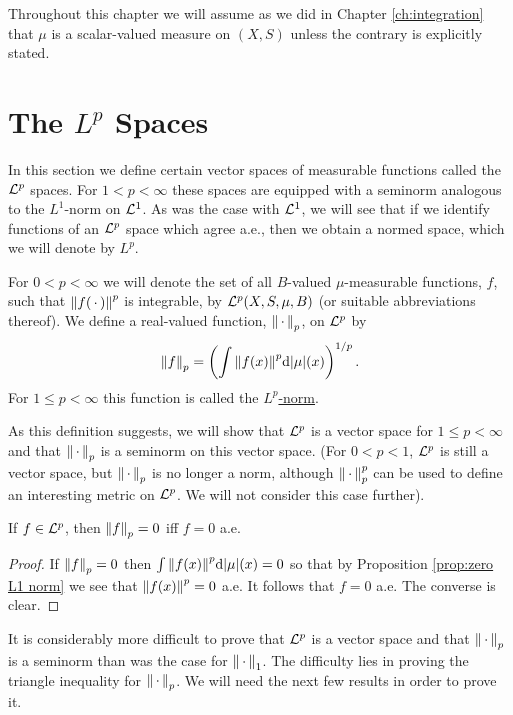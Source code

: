 
Throughout this chapter we will assume as we did in Chapter \ref{ch:integration} that $\mu$ is a scalar-valued measure on $(X,S)$ unless the contrary is explicitly stated.

\section{The \texorpdfstring{$L^p$}{Lp} Spaces}

In this section we define certain vector spaces of measurable functions called the ${\cal L}^p$ spaces. For $1<p<\infty$ these spaces are equipped with a seminorm analogous to the $L^1$-norm on ${\cal L}^1$. As was the case with ${\cal L}^1$, we will see that if we identify functions of an ${\cal L}^p$ space which agree a.e., then we obtain a normed space, which we will denote by $L^p$.

\begin{definition}
For $0<p<\infty$ we will denote the set of all $B$-valued $\mu$-measurable functions, $f$, such that $\norm{f(\,\cdot\,)}^p$ is integrable, by ${\cal L}^p(X,S,\mu,B)$ (or suitable abbreviations thereof). We define a real-valued function, $\norm{\,\cdot\,}_p$, on ${\cal L}^p$ by $$\norm{f}_p=\left(\int\norm{f(x)}^p\dd|\mu|(x)\right)^{1/p}.$$ For $1\leq p<\infty$ this function is called the \underline{$L^p$-norm}.
\end{definition}

As this definition suggests, we will show that ${\cal L}^p$ is a vector space for $1 \leq p<\infty$ and that $\norm{\,\cdot\,}_p$ is a seminorm on this vector space. (For $0<p<1$, ${\cal L}^p$ is still a vector space, but $\norm{\,\cdot\,}_p$ is no longer a norm, although $\norm{\,\cdot\,}_p^p$ can be used to define an interesting metric on ${\cal L}^p$. We will not consider this case further).

\begin{proposition}
\label{prop:zero Lp norm}
If $f\in{\cal L}^p$, then $\norm{f}_p=0$ iff $f=0$ a.e.
\end{proposition}

\begin{proof}
If $\norm{f}_p=0$ then $\int\norm{f(x)}^p\dd|\mu|(x)=0$ so that by Proposition \ref{prop:zero L1 norm} we see that $\norm{f(x)}^p=0$ a.e. It follows that $f=0$ a.e. The converse is clear.
\end{proof}

It is considerably more difficult to prove that ${\cal L}^p$ is a vector space and that $\norm{\,\cdot\,}_p$ is a seminorm than was the case for $\norm{\,\cdot\,}_1$. The difficulty lies in proving the triangle inequality for $\norm{\,\cdot\,}_p$. We will need the next few results in order to prove it.

